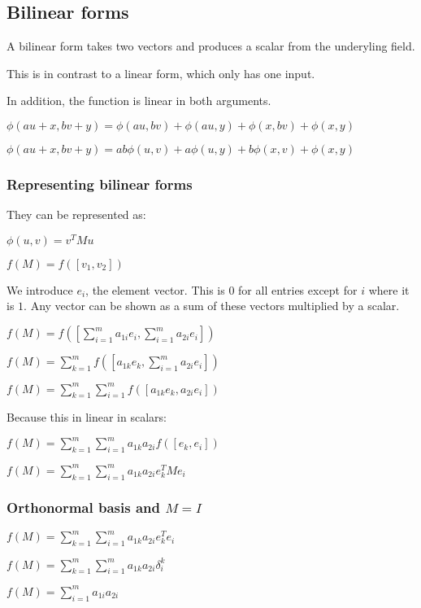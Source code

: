 
\subsection{Bilinear forms}

A bilinear form takes two vectors and produces a scalar from the underyling field.

This is in contrast to a linear form, which only has one input.

In addition, the function is linear in both arguments.

\(\phi (au+x, bv+y)=\phi (au,bv)+\phi (au,y)+\phi (x,bv)+\phi (x,y)\)

\(\phi (au+x, bv+y)=ab\phi (u,v)+a\phi (u,y)+b\phi (x,v)+\phi (x,y)\)

\subsubsection{Representing bilinear forms}

They can be represented as:

\(\phi (u,v)=v^TMu\)

\(f(M)=f([v_1,v_2])\)

We introduce \(e_i\), the element vector. This is \(0\) for all entries except for \(i\) where it is \(1\). Any vector can be shown as a sum of these vectors multiplied by a scalar.

\(f(M)=f([\sum^m_{i=1}a_{1i}e_i,\sum^m_{i=1}a_{2i}e_i])\)

\(f(M)=\sum_{k=1}^mf([a_{1k}e_k,\sum^m_{i=1}a_{2i}e_i])\)

\(f(M)=\sum_{k=1}^m\sum^m_{i=1}f([a_{1k}e_k,a_{2i}e_i])\)

Because this in linear in scalars:

\(f(M)=\sum_{k=1}^m\sum^m_{i=1}a_{1k}a_{2i}f([e_k,e_i])\)

\(f(M)=\sum_{k=1}^m\sum^m_{i=1}a_{1k}a_{2i}e_k^TMe_i\)

\subsubsection{Orthonormal basis and \(M=I\)}

\(f(M)=\sum_{k=1}^m\sum^m_{i=1}a_{1k}a_{2i}e_k^Te_i\)

\(f(M)=\sum_{k=1}^m\sum^m_{i=1}a_{1k}a_{2i}\delta_i^k\)

\(f(M)=\sum^m_{i=1}a_{1i}a_{2i}\)

